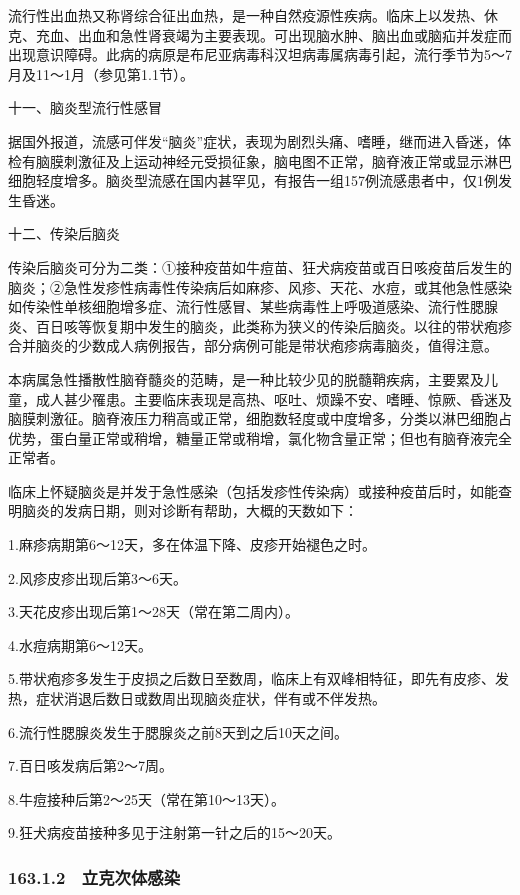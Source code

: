 流行性出血热又称肾综合征出血热，是一种自然疫源性疾病。临床上以发热、休克、充血、出血和急性肾衰竭为主要表现。可出现脑水肿、脑出血或脑疝并发症而出现意识障碍。此病的病原是布尼亚病毒科汉坦病毒属病毒引起，流行季节为5～7月及11～1月（参见第1.1节）。

\hypertarget{text00370.htmlux5cux23CHP49-5-1-1-11}{}
十一、脑炎型流行性感冒

据国外报道，流感可伴发“脑炎”症状，表现为剧烈头痛、嗜睡，继而进入昏迷，体检有脑膜刺激征及上运动神经元受损征象，脑电图不正常，脑脊液正常或显示淋巴细胞轻度增多。脑炎型流感在国内甚罕见，有报告一组157例流感患者中，仅1例发生昏迷。

\hypertarget{text00370.htmlux5cux23CHP49-5-1-1-12}{}
十二、传染后脑炎

传染后脑炎可分为二类：①接种疫苗如牛痘苗、狂犬病疫苗或百日咳疫苗后发生的脑炎；②急性发疹性病毒性传染病后如麻疹、风疹、天花、水痘，或其他急性感染如传染性单核细胞增多症、流行性感冒、某些病毒性上呼吸道感染、流行性腮腺炎、百日咳等恢复期中发生的脑炎，此类称为狭义的传染后脑炎。以往的带状疱疹合并脑炎的少数成人病例报告，部分病例可能是带状疱疹病毒脑炎，值得注意。

本病属急性播散性脑脊髓炎的范畴，是一种比较少见的脱髓鞘疾病，主要累及儿童，成人甚少罹患。主要临床表现是高热、呕吐、烦躁不安、嗜睡、惊厥、昏迷及脑膜刺激征。脑脊液压力稍高或正常，细胞数轻度或中度增多，分类以淋巴细胞占优势，蛋白量正常或稍增，糖量正常或稍增，氯化物含量正常；但也有脑脊液完全正常者。

临床上怀疑脑炎是并发于急性感染（包括发疹性传染病）或接种疫苗后时，如能查明脑炎的发病日期，则对诊断有帮助，大概的天数如下：

1.麻疹病期第6～12天，多在体温下降、皮疹开始褪色之时。

2.风疹皮疹出现后第3～6天。

3.天花皮疹出现后第1～28天（常在第二周内）。

4.水痘病期第6～12天。

5.带状疱疹多发生于皮损之后数日至数周，临床上有双峰相特征，即先有皮疹、发热，症状消退后数日或数周出现脑炎症状，伴有或不伴发热。

6.流行性腮腺炎发生于腮腺炎之前8天到之后10天之间。

7.百日咳发病后第2～7周。

8.牛痘接种后第2～25天（常在第10～13天）。

9.狂犬病疫苗接种多见于注射第一针之后的15～20天。

\subsubsection{163.1.2　立克次体感染}

